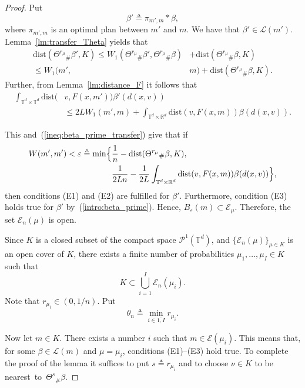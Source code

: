 \documentclass[12pt]{article}
\newcommand{\ptd}{\mathcal{P}^1(\mathbb{T}^d)}
\newcommand{\inttdtd}{\int_{\mathbb{T}^d\times \mathbb{T}^d}}
\newcommand{\inttrd}{\int_{\mathbb{T}^d\times \mathbb{R}^d}}
\begin{document}
\begin{proof}
	Put \begin{equation}\label{intro:beta_prime}
	\beta'\triangleq \pi_{m',m}*\beta,
	\end{equation}  where $\pi_{m',m}$ is an optimal plan between $m'$ and $m$.
	We have that $\beta'\in \mathcal{L}(m')$. %
	Lemma~\ref{lm:transfer_Theta} yields that 
	\begin{equation}\label{ineq:beta_prime_transfer}
	\begin{split}
	\mathrm{dist}(\Theta^{r_\mu}{}_\#\beta',K)
	\leq W_1(\Theta^{r_\mu}{}_\#\beta',\Theta^{r_\mu}{}_\#\beta)&+\mathrm{dist}(\Theta^{r_\mu}{}_\#\beta,K)\\ \leq W_1(m',&m)+\mathrm{dist}(\Theta^{r_\mu}{}_\#\beta,K).\end{split}
	\end{equation}
	Further, from Lemma~\ref{lm:distance_F} it follows  that
	\begin{equation*}\begin{split}\inttdtd\mathrm{dist}(&v,F(x,m'))\beta'(d(x,v))\\&\leq 2LW_1(m',m)+\inttrd\mathrm{dist}(v,F(x,m))\beta(d(x,v)).\end{split}\end{equation*}
	
	
	This and~(\ref{ineq:beta_prime_transfer}) give that if \begin{equation*}\begin{split}
	W(m',m')<\varepsilon \triangleq\min\Bigl\{&\frac{1}{n}-\mathrm{dist}(\Theta^{r_\mu}{}_\#\beta,K),
	\\&\frac{1}{2Ln}-\frac{1}{2L} \inttrd\mathrm{dist}(v,F(x,m))\beta(d(x,v))\Bigr\},\end{split} \end{equation*} then conditions (E1) and (E2) are fulfilled for $\beta'$. Furthermore, condition (E3) holds true for $\beta'$ by~(\ref{intro:beta_prime}). Hence, $B_\varepsilon(m)\subset\mathcal{E}_\mu$. Therefore, the set $\mathcal{E}_n(\mu)$ is open.
	
	Since $K$ is a closed subset of the compact space $\ptd$, and $\{\mathcal{E}_n(\mu)\}_{\mu\in K}$ is an open cover of $K$, there exists a finite number of probabilities $\mu_1,\ldots,\mu_I\in K$ such that
	$$%
	K\subset \bigcup_{i=1}^I\mathcal{E}_n(\mu_i). 
	$$%
	Note that $r_{\mu_i}\in (0,1/n)$.
	Put $$\theta_n\triangleq\min_{i\in \overline{1,I}}r_{\mu_i}.$$
	
	Now let $m\in K$. There exists a number $i$ such that $m\in\mathcal{E}(\mu_i)$. This means that, for some $\beta\in\mathcal{L}(m)$ and $\mu=\mu_i$, conditions (E1)--(E3) hold true. To complete the proof of the lemma it suffices to put $s\triangleq r_{\mu_i}$ and to choose $\nu\in K$ to be nearest~to~$\Theta^s{}_\#\beta$. 
\end{proof}
\end{document}
